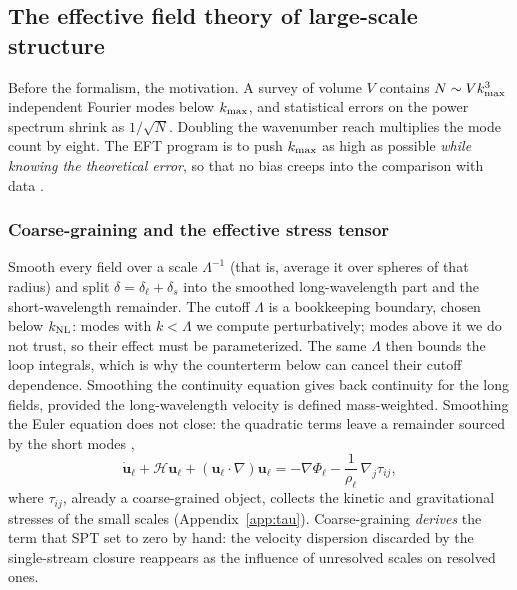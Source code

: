 \documentclass[a4paper,11pt]{article}
\newcommand{\vu}{\bm{u}}
\def\cH{\mathcal{H}}
\def\knl{k_{\rm NL}}
\numberwithin{equation}{section}
\begin{document}
\subsection{The effective field theory of large-scale structure}
\label{sec:eft}

Before the formalism, the motivation. A survey of volume $V$ contains $N \sim V k_{\rm max}^3$ independent Fourier modes below $k_{\rm max}$, and statistical errors on the power spectrum shrink as $1/\sqrt{N}$. Doubling the wavenumber reach multiplies the mode count by eight. The EFT program is to push $k_{\rm max}$ as high as possible \emph{while knowing the theoretical error}, so that no bias creeps into the comparison with data \cite{BaumannCargese}.

\subsubsection{Coarse-graining and the effective stress tensor}

Smooth every field over a scale $\Lambda^{-1}$ (that is, average it over spheres of that radius) and split $\delta = \delta_\ell + \delta_s$ into the smoothed long-wavelength part and the short-wavelength remainder. The cutoff $\Lambda$ is a bookkeeping boundary, chosen below $\knl$: modes with $k<\Lambda$ we compute perturbatively; modes above it we do not trust, so their effect must be parameterized. The same $\Lambda$ then bounds the loop integrals, which is why the counterterm below can cancel their cutoff dependence. Smoothing the continuity equation gives back continuity for the long fields, provided the long-wavelength velocity is defined mass-weighted. Smoothing the Euler equation does not close: the quadratic terms leave a remainder sourced by the short modes \cite[App.~A]{Baumann2010},
\begin{equation}
\dot{\vu}_\ell + \cH\vu_\ell + (\vu_\ell\cdot\nabla)\vu_\ell
= -\nabla\Phi_\ell - \frac{1}{\rho_\ell}\,\nabla_j\tau_{ij} ,
\label{eq:smoothed_euler}
\end{equation}
where $\tau_{ij}$, already a coarse-grained object, collects the kinetic and gravitational stresses of the small scales (Appendix~\ref{app:tau}). Coarse-graining \emph{derives} the term that SPT set to zero by hand: the velocity dispersion discarded by the single-stream closure reappears as the influence of unresolved scales on resolved ones.
\end{document}
